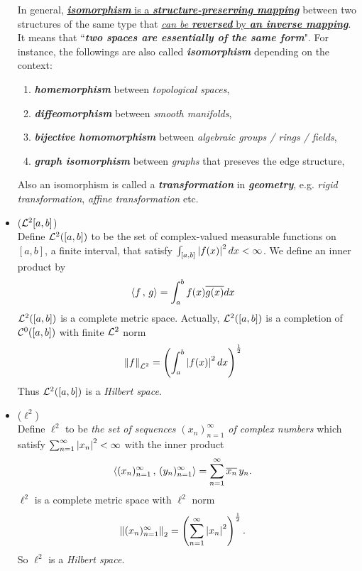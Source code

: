 \documentclass[11pt]{article}
\begin{document}
\begin{itemize}
\begin{remark}
In general, \underline{\emph{\textbf{isomorphism}} is a \emph{\textbf{structure-preserving mapping}}} between two structures of the same type that \underline{\emph{can be \textbf{reversed}} by \emph{\textbf{an inverse mapping}}}. It means that ``\emph{\textbf{two spaces are essentially of the same form}}". For instance, the followings are also called \emph{\textbf{isomorphism}} depending on the context:
\begin{enumerate}
\item \emph{\textbf{homemorphism}} between \emph{topological spaces},
\item \emph{\textbf{diffeomorphism}} between \emph{smooth manifolds},
\item \emph{\textbf{bijective homomorphism}} between \emph{algebraic groups / rings / fields},
\item \emph{\textbf{graph isomorphism}} between \emph{graphs} that preseves the edge structure,
\end{enumerate}
 Also an isomorphism is called  a \emph{\textbf{transformation}} in \emph{\textbf{geometry}}, e.g. \emph{rigid transformation}, \emph{affine transformation} etc.
\end{remark}

\item \begin{example} (${\mathcal L}^2[a, b]$)\\
Define ${\mathcal L}^2([a, b])$ to be the set of complex-valued measurable functions on $[a, b]$, a finite interval, that satisfy $\int_{[a, b]} \left\lvert f(x) \right\rvert^2 dx < \infty$.
We define an inner product by
\begin{align*}
\left\langle f\,,\, g \right\rangle &= \int_{a}^{b}f(x)\overline{g(x)} dx
\end{align*} ${\mathcal L}^2([a, b])$ is a complete metric space. Actually, ${\mathcal L}^2([a,b])$ is a completion of ${\mathcal C}^{0}([a,b])$ with finite ${\mathcal L}^2$ norm
\begin{align*}
\left\|f\right\|_{{\mathcal L}^2} &= \left(\int_{a}^{b} \left\lvert f(x) \right\rvert^2 dx \right)^{\frac{1}{2}}
\end{align*} Thus ${\mathcal L}^2([a, b])$ is a \emph{Hilbert space}.
\end{example}

\item \begin{example} ($\ell^2$)\\
Define $\ell^2$ to be \emph{the set of sequences $(x_n)_{n=1}^{\infty}$ of complex numbers} which satisfy $\sum_{n= 1}^{\infty}\left\lvert x_n \right\rvert^2 < \infty$ with the inner product
\begin{align*}
\left\langle (x_n)_{n=1}^{\infty}\,,\, (y_n)_{n=1}^{\infty} \right\rangle &= \sum_{n= 1}^{\infty}\overline{x_n}\,y_n.
\end{align*} $\ell^2$ is a complete metric space with $\ell^2$ norm 
\begin{align*}
\left\|(x_n)_{n=1}^{\infty}\right\|_{2} &= \left(\sum_{n= 1}^{\infty}\left\lvert x_n \right\rvert^2\right)^{\frac{1}{2}}.
\end{align*} So $\ell^2$ is a \emph{Hilbert space}. 


\end{example}
\end{itemize}
\end{document}
